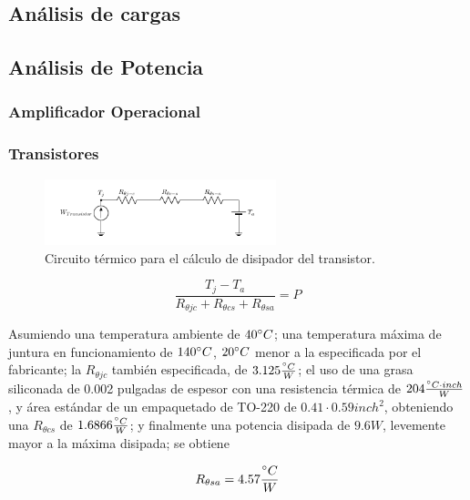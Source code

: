 \subsection{Análisis de cargas}

\subsection{Análisis de Potencia}

\subsubsection{Amplificador Operacional}

\subsubsection{Transistores}

\begin{figure}[H]
\centering
	\includegraphics[width=0.6\textwidth, page=1]{ImagenesEjercicio2/Potencia - Transistor.pdf}
	\caption{Circuito térmico para el cálculo de disipador del transistor.}
	\label{fig:circuitopottrans}
\end{figure}

\begin{equation}
\frac{T_j - T_a}{R_{\theta jc}+R_{\theta cs}+R_{\theta sa}} = P
\end{equation}

Asumiendo una temperatura ambiente de $40\degree C$; una temperatura máxima de juntura en funcionamiento de $140\degree C$, $20\degree C$ menor a la especificada por el fabricante; la $R_{\theta jc}$ también especificada, de $3.125\frac{\degree C}{W}$; el uso de una grasa siliconada de 0.002 pulgadas de espesor con una resistencia térmica de $204\frac{\degree C \cdot inch}{W}$, y área estándar de un empaquetado de TO-220 de $0.41\cdot 0.59 inch^2$, obteniendo una $R_{\theta cs}$ de $1.6866 \frac{\degree C}{W}$; y finalmente una potencia disipada de $9.6W$, levemente mayor a la máxima disipada; se obtiene

\begin{equation}
R_{\theta sa} = 4.57 \frac{\degree C}{W}
\end{equation}
